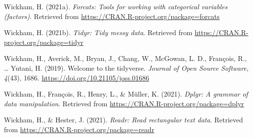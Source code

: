 \documentclass[
  english,
  man,floatsintext]{apa6}
\begin{document}
\leavevmode\hypertarget{ref-R-forcats}{}%
Wickham, H. (2021a). \emph{Forcats: Tools for working with categorical variables (factors)}. Retrieved from \url{https://CRAN.R-project.org/package=forcats}

\leavevmode\hypertarget{ref-R-tidyr}{}%
Wickham, H. (2021b). \emph{Tidyr: Tidy messy data}. Retrieved from \url{https://CRAN.R-project.org/package=tidyr}

\leavevmode\hypertarget{ref-R-tidyverse}{}%
Wickham, H., Averick, M., Bryan, J., Chang, W., McGowan, L. D., François, R., \ldots{} Yutani, H. (2019). Welcome to the tidyverse. \emph{Journal of Open Source Software}, \emph{4}(43), 1686. \url{https://doi.org/10.21105/joss.01686}

\leavevmode\hypertarget{ref-R-dplyr}{}%
Wickham, H., François, R., Henry, L., \& Müller, K. (2021). \emph{Dplyr: A grammar of data manipulation}. Retrieved from \url{https://CRAN.R-project.org/package=dplyr}

\leavevmode\hypertarget{ref-R-readr}{}%
Wickham, H., \& Hester, J. (2021). \emph{Readr: Read rectangular text data}. Retrieved from \url{https://CRAN.R-project.org/package=readr}

\endgroup
\end{document}

